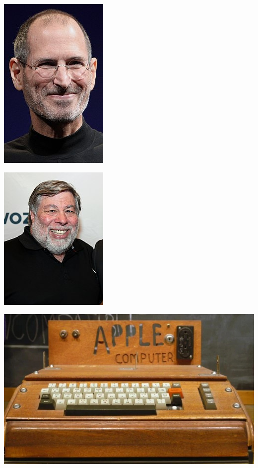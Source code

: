 \begin{multicols}{2}
	\begin{center}
		\includegraphics[height=.9\textheight]{./IMG/jobs.jpg}
	\end{center}

\vfill
\columnbreak
	\begin{center}
	\includegraphics[height=.9\textheight]{./IMG/woz.jpg}
\end{center}

\vfill
\pagebreak	
\end{multicols}

	\begin{center}
	\includegraphics[height=\textheight]{./IMG/312582987_209249291451882_2562526748956703228_n.jpg}
\end{center}

